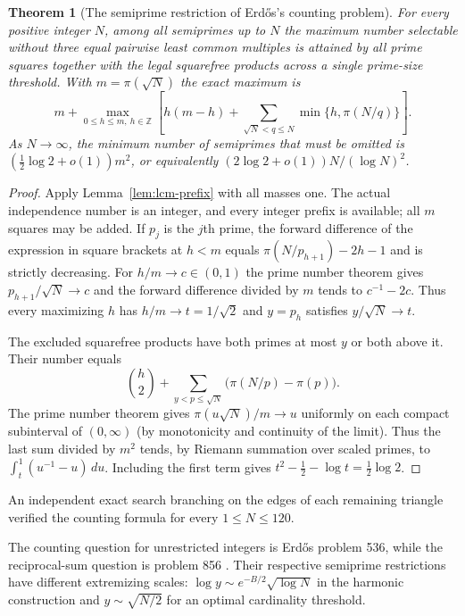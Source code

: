 \documentclass[11pt,a4paper]{article}
\newtheorem{theorem}{Theorem}[section]
\begin{document}
\begin{theorem}[The semiprime restriction of Erd\H{o}s's counting problem]
\label{thm:lcm-count}
For every positive integer $N$, among all semiprimes up to $N$ the maximum number selectable without
three equal pairwise least common multiples is attained by all prime
squares together with the legal squarefree products across a single
prime-size threshold. With $m=\pi(\sqrt N)$ the exact maximum is
\[
 m+\max_{0\le h\le m,\ h\in\mathbb Z}
  \left[h(m-h)+\sum_{\sqrt N<q\le N}\min\{h,\pi(N/q)\}\right].
\]
As $N\to\infty$, the minimum number of semiprimes that must be omitted
is $(\tfrac12\log 2+o(1))m^2$, or equivalently
$(2\log 2+o(1))N/(\log N)^2$.
\end{theorem}
\begin{proof}
Apply Lemma~\ref{lem:lcm-prefix} with all masses one. The actual
independence number is an integer, and every integer prefix is available;
all $m$ squares may be added. If $p_j$ is the $j$th prime, the forward
difference of the expression in square brackets at $h<m$ equals
$\pi(N/p_{h+1})-2h-1$ and is strictly decreasing. For
$h/m\to c\in(0,1)$ the prime number theorem gives
$p_{h+1}/\sqrt N\to c$ and the forward difference divided by $m$ tends
to $c^{-1}-2c$. Thus every maximizing $h$ has $h/m\to t=1/\sqrt2$
and $y=p_h$ satisfies $y/\sqrt N\to t$.

The excluded squarefree products have both primes at most $y$ or both
above it. Their number equals
\[
 \binom h2+\sum_{y<p\le\sqrt N}\bigl(\pi(N/p)-\pi(p)\bigr).
\]
The prime number theorem gives $\pi(u\sqrt N)/m\to u$ uniformly on each
compact subinterval of $(0,\infty)$ (by monotonicity and continuity of
the limit). Thus the last sum divided by $m^2$ tends, by Riemann
summation over scaled primes, to $\int_t^1(u^{-1}-u)\,du$. Including
the first term gives $t^2-\tfrac12-\log t=\tfrac12\log 2$.
\end{proof}

An independent exact search branching on the edges of each remaining triangle verified the counting formula for every $1\le N\le120$.

The counting question for unrestricted integers is Erd\H{o}s problem 536,
while the reciprocal-sum question is problem 856 \cite{erdos-lcm}. Their respective
semiprime restrictions have different extremizing scales:
$\log y\sim e^{-B/2}\sqrt{\log N}$ in the harmonic construction and
$y\sim\sqrt{N/2}$ for an optimal cardinality threshold.
\end{document}
